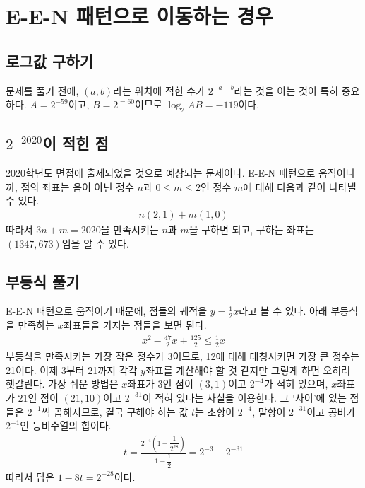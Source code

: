 \documentclass{scrartcl}
\title{\doctitle}
\author{Project Eclipse (손량)}
\date{Last compiled on: \today, \currenttime}
\begin{document}
\maketitle

\section{E-E-N 패턴으로 이동하는 경우}
\subsection{로그값 구하기}
문제를 풀기 전에, \((a,b)\)라는 위치에 적힌 수가 \(2^{-a-b}\)라는 것을 아는 것이 특히 중요하다. \(A=2^{-59}\)이고, \(B=2^{=60}\)이므로 \(\log_2{AB}=-119\)이다.

\subsection{\texorpdfstring{\(2^{-2020}\)}{2\^(-2020)}이 적힌 점}
2020학년도 면접에 출제되었을 것으로 예상되는 문제이다. E-E-N 패턴으로 움직이니까, 점의 좌표는 음이 아닌 정수 \(n\)과 \(0\leq m\leq 2\)인 정수 \(m\)에 대해 다음과 같이 나타낼 수 있다.
\begin{align*}
  n(2,1)+m(1,0)
\end{align*}
따라서 \(3n+m=2020\)을 만족시키는 \(n\)과 \(m\)을 구하면 되고, 구하는 좌표는 \((1347, 673)\)임을 알 수 있다.

\subsection{부등식 풀기}
E-E-N 패턴으로 움직이기 때문에, 점들의 궤적을 \(y=\frac{1}{2}x\)라고 볼 수 있다. 아래 부등식을 만족하는 \(x\)좌표들을 가지는 점들을 보면 된다.
\begin{align*}
  x^2-\frac{47}{2}x+\frac{125}{2}\leq\frac{1}{2}x
\end{align*}
부등식을 만족시키는 가장 작은 정수가 3이므로, 12에 대해 대칭시키면 가장 큰 정수는 21이다. 이제 3부터 21까지 각각 \(y\)좌표를 계산해야 할 것 같지만 그렇게 하면 오히려 헷갈린다. 가장 쉬운 방법은 \(x\)좌표가 3인 점이 \((3, 1)\)이고 \(2^{-4}\)가 적혀 있으며, \(x\)좌표가 21인 점이 \((21, 10)\)이고 \(2^{-31}\)이 적혀 있다는 사실을 이용한다. 그 `사이'에 있는 점들은 \(2^{-1}\)씩 곱해지므로, 결국 구해야 하는 값 \(t\)는 초항이 \(2^{-4}\), 말항이 \(2^{-31}\)이고 공비가 \(2^{-1}\)인 등비수열의 합이다.
\begin{align*}
  t=\frac{2^{-4}\left(1-\dfrac{1}{2^{28}}\right)}{1-\dfrac{1}{2}}=2^{-3}-2^{-31}
\end{align*}
따라서 답은 \(1-8t=2^{-28}\)이다.
\end{document}
